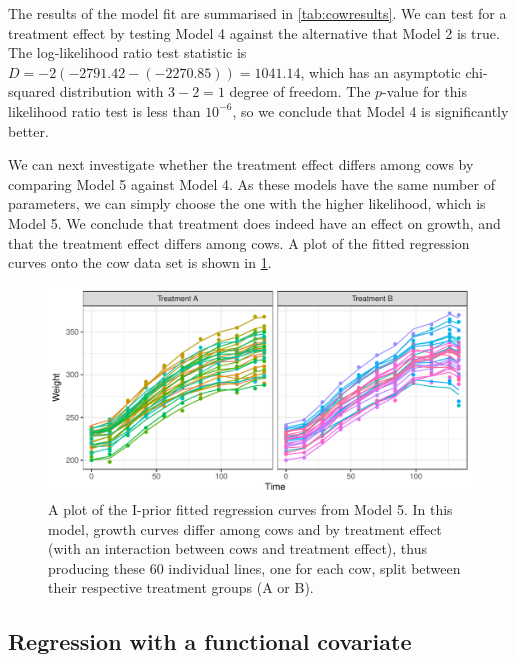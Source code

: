 \documentclass[showframe,11pt]{report}\usepackage[]{graphicx}\usepackage[]{color}
\makeatletter
\def\maxwidth{ %
  \ifdim\Gin@nat@width>\linewidth
    \linewidth
  \else
    \Gin@nat@width
  \fi
}
\newenvironment{knitrout}{}{} %
\makeatother
\begin{document}
The results of the model fit are summarised in \cref{tab:cowresults}. We can test for a treatment effect by testing Model 4 against the alternative that Model 2 is true.
The log-likelihood ratio test statistic is
$D = -2(-2791.42 - (-2270.85)) = 1041.14$, which has an asymptotic chi-squared distribution with $3 - 2 = 1$ degree of freedom.
The $p$-value for this likelihood ratio test is less than $10^{-6}$, so we conclude that Model 4 is significantly better.

We can next investigate whether the treatment effect differs among cows by comparing Model 5 against Model 4.
As these models have the same number of parameters, we can simply choose the one with the higher likelihood, which is Model 5.
We conclude that treatment does indeed have an effect on growth, and that the treatment effect differs among cows.
A plot of the fitted regression curves onto the cow data set is shown in \cref{fig:cows.plot}.

\begin{knitrout}
\color{fgcolor}\begin{figure}[htb]

{\centering \includegraphics[width=\maxwidth]{figure/04-cows_plot-1} 

}

\caption[A plot of the I-prior fitted regression curves from Model 5]{A plot of the I-prior fitted regression curves from Model 5. In this model, growth curves differ among cows and by treatment effect (with an interaction between cows and treatment effect), thus producing these 60 individual lines, one for each cow, split between their respective treatment groups (A or B).}\label{fig:cows.plot}
\end{figure}


\end{knitrout}

\subsection{Regression with a functional covariate}
\end{document}
